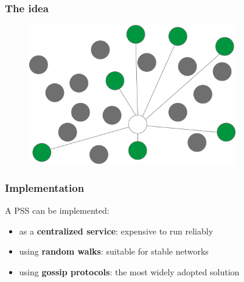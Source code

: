 \documentclass{beamer}
\begin{document}
\begin{frame}[noframenumbering]
\frametitle{The idea}

\begin{figure}
\includegraphics[keepaspectratio=true, width=0.8\textwidth]{images/new_pss_3.png}
\end{figure}
\end{frame}


\begin{frame}
\frametitle{Implementation}
A PSS can be implemented:
\begin{itemize}
	\item as a \textbf{centralized service}: expensive to run reliably
	\item using \textbf{random walks}: suitable for stable networks
  \item using \textbf{gossip protocols}: the most widely adopted solution
\end{itemize}
\end{frame}
\end{document}
